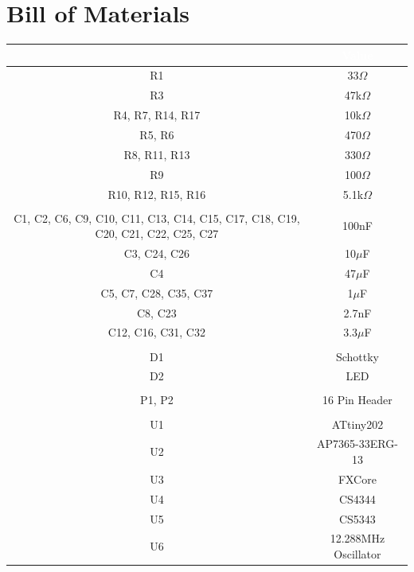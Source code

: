 \documentclass[a4paper, 10pt]{article}
\begin{document}
\section{Bill of Materials}
{
\begin{tabular}{|c|c|}
\hline
\rowcolor{gray}{\LARGE\textcolor{white}{\textbf{Name}}} &  {\LARGE\textcolor{white}{\textbf{Value}}}\\
\hline
R1 & 33$\Omega$\\
\hline
R3 & 47k$\Omega$ \\
\hline
R4, R7, R14, R17 & 10k$\Omega$ \\
\hline
R5, R6 & 470$\Omega$ \\
\hline
R8, R11, R13 & 330$\Omega$ \\
\hline
R9 & 100$\Omega$ \\
\hline
R10, R12, R15, R16 & 5.1k$\Omega$ \\
\hline
 &  \\
\hline
C1, C2, C6, C9, C10, C11, C13, C14, C15, C17, C18, C19, C20, C21, C22, C25, C27 & 100nF \\
\hline
C3, C24, C26 & 10$\mu$F \\
\hline
C4 & 47$\mu$F \\
\hline
C5, C7, C28, C35, C37 & 1$\mu$F \\
\hline
C8, C23 & 2.7nF \\
\hline
C12, C16, C31, C32 & 3.3$\mu$F \\
\hline
 &  \\
\hline
D1 & Schottky \\
\hline
D2 & LED \\
\hline
 &  \\
\hline
P1, P2 & 16 Pin Header \\
\hline
 &  \\
\hline
U1 & ATtiny202 \\
\hline
U2 & AP7365-33ERG-13 \\
\hline
U3 & FXCore \\
\hline
U4 & CS4344 \\
\hline
U5 & CS5343 \\
\hline
U6 & 12.288MHz Oscillator \\
\hline
\end{tabular}}
\newpage
\end{document}
